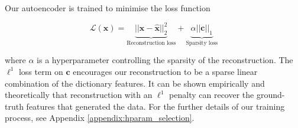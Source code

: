 Our autoencoder is trained to minimise the loss function

\begin{equation}
\label{eqn:loss_function}
    \mathcal L(\mathbf x)= \underbrace{||\mathbf{x}- \mathbf{\hat x}||_2^2}_{\text{Reconstruction loss}} + \underbrace{\alpha ||\mathbf{c}||_1}_{\text{Sparsity loss}}
\end{equation}

where $\alpha$ is a hyperparameter controlling the sparsity of the reconstruction. The $\ell^1$ loss term on $\mathbf c$ encourages our reconstruction to be a sparse linear combination of the dictionary features. It can be shown empirically \citep{sharkey2023technical} and theoretically \citep{wright2022high} that reconstruction with an $\ell^1$ penalty can recover the ground-truth features that generated the data. For the further details of our training process, see Appendix \ref{appendix:hparam_selection}.

